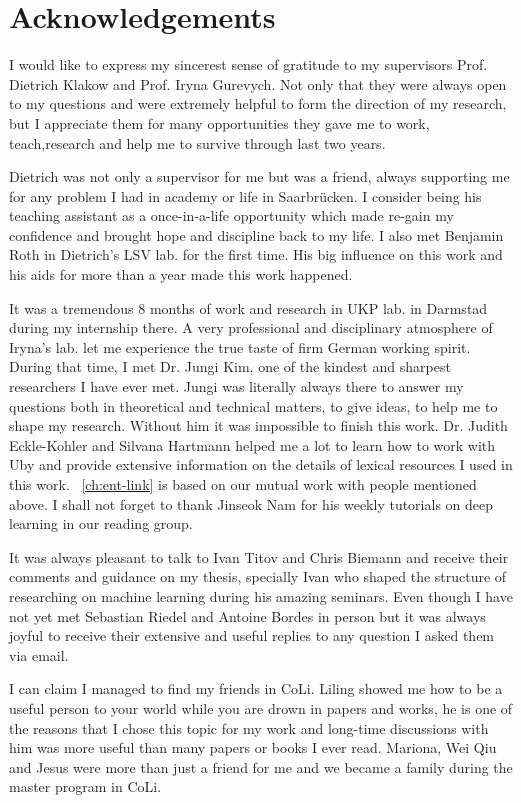 \chapter*{Acknowledgements}
I would like to express my sincerest sense of gratitude to my supervisors Prof.
Dietrich Klakow and Prof. Iryna Gurevych. Not only that they were always open to
my questions and were extremely helpful to form the direction of my research,
but I appreciate them for many opportunities they gave me to work,
teach,research and help me to survive through last two years.

Dietrich was not only a supervisor for me but was a friend, always supporting me
for any problem I had in academy or life in Saarbr\"{u}cken. I consider being his
teaching assistant as a once-in-a-life opportunity which made re-gain my confidence and
brought hope and discipline back to my life. I also met Benjamin Roth in
Dietrich's LSV lab. for the first time. His big influence on this work and his
aids for more than a year made this work happened.

It was a tremendous 8 months of work and research in UKP lab.
in Darmstad during my internship there. A very professional and disciplinary
atmosphere of Iryna's lab. let me experience the true taste of firm German
working spirit. During that time, I met Dr. Jungi Kim, one of the kindest and
sharpest researchers I have ever met. Jungi was literally always there to answer
my questions both in theoretical and technical matters, to give ideas, to help
me to shape my research. Without him it was impossible to finish this work. Dr.
Judith Eckle-Kohler and Silvana Hartmann helped me a lot to learn how to work
with Uby and provide extensive information on the details of lexical resources I
used in this work. ~\autoref{ch:ent-link} is based on our mutual work with
people mentioned above. I shall not forget to thank Jinseok Nam for his
weekly tutorials on deep learning in our reading group.

It was always pleasant to talk to Ivan Titov and Chris Biemann
and receive their comments and guidance on my thesis, specially Ivan who shaped
the structure of researching on machine learning during his amazing seminars.
Even though I have not yet met Sebastian Riedel and Antoine Bordes in person but it was
always joyful to receive their extensive and useful replies to any question I
asked them via email.

I can claim I managed to find my friends in CoLi. Liling showed me how to be
a useful person to your world  while you are drown in papers and works, he is
one of the reasons that I chose this topic for my work and long-time discussions
with him was more useful than many papers or books I ever read. Mariona, Wei
Qiu and Jesus were more than just a friend for me and we became a family during
the master program in CoLi.

